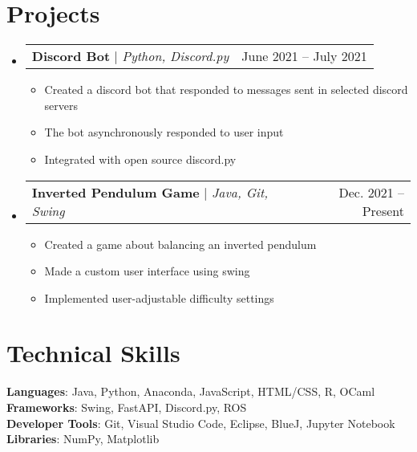 \documentclass[letterpaper,11pt]{article}
\makeatletter
\newcommand{\resumeItem}[1]{
  \item\small{
    {#1 \vspace{-2pt}}
  }
}
\newcommand{\resumeProjectHeading}[2]{
    \item
    \begin{tabular*}{0.97\textwidth}{l@{\extracolsep{\fill}}r}
      \small#1 & #2 \\
    \end{tabular*}\vspace{-7pt}
}
\newcommand{\resumeSubHeadingListStart}{\begin{itemize}[leftmargin=0.15in, label={}]}
\newcommand{\resumeSubHeadingListEnd}{\end{itemize}}
\newcommand{\resumeItemListStart}{\begin{itemize}}
\newcommand{\resumeItemListEnd}{\end{itemize}\vspace{-5pt}}
\makeatother
\begin{document}
\section{Projects}
    \resumeSubHeadingListStart
      \resumeProjectHeading
          {\textbf{Discord Bot} $|$ \emph{Python, Discord.py}}{June 2021 -- July 2021}
          \resumeItemListStart
            \resumeItem{Created a discord bot that responded to messages sent in selected discord servers}
            \resumeItem{The bot asynchronously responded to user input}
            \resumeItem{Integrated with open source discord.py}
          \resumeItemListEnd
      \resumeProjectHeading
          {\textbf{Inverted Pendulum Game} $|$ \emph{Java, Git, Swing}}{Dec. 2021 -- Present}
          \resumeItemListStart
            \resumeItem{Created a game about balancing an inverted pendulum}
            \resumeItem{Made a custom user interface using swing}
            \resumeItem{Implemented user-adjustable difficulty settings}
          \resumeItemListEnd
    \resumeSubHeadingListEnd



%
\section{Technical Skills}
 \begin{itemize}[leftmargin=0.15in, label={}]
    \small{\item{
     \textbf{Languages}{: Java, Python, Anaconda, JavaScript, HTML/CSS, R, OCaml} \\
     \textbf{Frameworks}{: Swing, FastAPI, Discord.py, ROS} \\
     \textbf{Developer Tools}{: Git, Visual Studio Code, Eclipse, BlueJ, Jupyter Notebook} \\
     \textbf{Libraries}{: NumPy, Matplotlib}
    }}
 \end{itemize}


\end{document}
